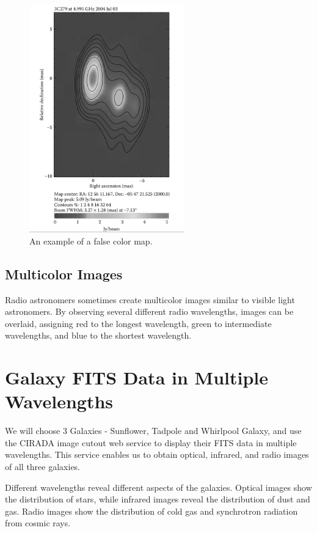 \begin{figure}[H]
    \centering
    \includegraphics[width=0.6\textwidth]{Images/false_colour_map.png}
    \caption{An example of a false color map.}
    \label{fig:false_color_map}
\end{figure}

\subsection{Multicolor Images}

Radio astronomers sometimes create multicolor images similar to visible light astronomers. By observing several different radio wavelengths, images can be overlaid, assigning red to the longest wavelength, green to intermediate wavelengths, and blue to the shortest wavelength.


\clearpage

\section{Galaxy FITS Data in Multiple Wavelengths}

We will choose 3 Galaxies - Sunflower, Tadpole and Whirlpool Galaxy, and use the CIRADA image cutout web service to display their FITS data in multiple wavelengths. This service enables us to obtain optical, infrared, and radio images of all three galaxies.

Different wavelengths reveal different aspects of the galaxies. Optical images show the distribution of stars, while infrared images reveal the distribution of dust and gas. Radio images show the distribution of cold gas and synchrotron radiation from cosmic rays.

